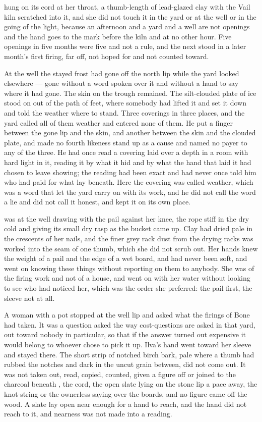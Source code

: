  hung on its cord at her throat, a thumb-length of lead-glazed clay with the Vail kiln scratched into it, and she did not touch it in the yard or at the well or in the going of the light, because an afternoon and a yard and a well are not openings and the hand goes to the mark before the kiln and at no other hour. Five openings in five months were five and not a rule, and the next stood in a later month's first firing, far off, not hoped for and not counted toward.

At the well the stayed frost had gone off the north lip while the yard looked elsewhere --- gone without a word spoken over it and without a hand to say where it had gone. The skin on the trough remained. The silt-clouded plate of ice stood on  out of the path of feet, where somebody had lifted it and set it down and told the weather where to stand. Three coverings in three places, and the yard called all of them weather and entered none of them. He put a finger between the gone lip and the skin, and another between the skin and the clouded plate, and made no fourth likeness stand up as a cause and named no payer to any of the three. He had once read a covering laid over a depth in a room with hard light in it, reading it by what it hid and by what the hand that laid it had chosen to leave showing; the reading had been exact and had never once told him who had paid for what lay beneath. Here the covering was called weather, which was a word that let the yard carry on with its work, and he did not call the word a lie and did not call it honest, and kept it on its own place.

\scenebreak

 was at the well drawing with the pail against her knee, the rope stiff in the dry cold and giving its small dry rasp as the bucket came up. Clay had dried pale in the crescents of her nails, and the finer grey rack dust from the drying racks was worked into the seam of one thumb, which she did not scrub out. Her hands knew the weight of a pail and the edge of a wet board, and had never been soft, and went on knowing these things without reporting on them to anybody. She was of the firing work and not of a house, and went on with her water without looking to see who had noticed her, which was the order she preferred: the pail first, the sleeve not at all.

A woman with a pot stopped at the well lip and asked what the firings of Bone had taken. It was a question asked the way cost-questions are asked in that yard, out toward nobody in particular, so that if the answer turned out expensive it would belong to whoever chose to pick it up. Ilva's hand went toward her sleeve and stayed there. The short strip of notched birch bark, pale where a thumb had rubbed the notches and dark in the uncut grain between, did not come out. It was not taken out, read, copied, counted, given a figure off or joined to the charcoal beneath , the cord, the open slate lying on the stone lip a pace away, the knot-string or the ownerless saying over the boards, and no figure came off the wood. A slate lay open near enough for a hand to reach, and the hand did not reach to it, and nearness was not made into a reading.

